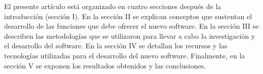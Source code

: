 \documentclass[conference]{IEEEtran}
\begin{document}
El presente art\'{i}culo est\'{a} organizado en cuatro secciones despu\'{e}s de la introducci\'{o}n (secci\'{o}n I). En la secci\'{o}n II se explican conceptos que sustentan el desarrollo de las funciones que debe ofrecer el nuevo software. En la secci\'{o}n III se describen las metodolog\'{i}as que se utilizaron para llevar a cabo la investigaci\'{o}n y el desarrollo del software. En la secci\'{o}n IV se detallan los recursos y las tecnolog\'{i}as utilizadas para el desarrollo del nuevo software. Finalmente, en la secci\'{o}n V se exponen los resultados obtenidos y las conclusiones.


%
%



%
%
\end{document}
